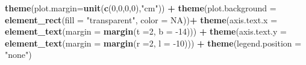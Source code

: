 \documentclass[12pt,oneside]{reedthesis}
\newenvironment{Shaded}{\begin{snugshade}}{\end{snugshade}}
\newcommand{\DataTypeTok}[1]{\textcolor[rgb]{0.13,0.29,0.53}{#1}}
\newcommand{\DecValTok}[1]{\textcolor[rgb]{0.00,0.00,0.81}{#1}}
\newcommand{\KeywordTok}[1]{\textcolor[rgb]{0.13,0.29,0.53}{\textbf{#1}}}
\newcommand{\NormalTok}[1]{#1}
\newcommand{\OperatorTok}[1]{\textcolor[rgb]{0.81,0.36,0.00}{\textbf{#1}}}
\newcommand{\OtherTok}[1]{\textcolor[rgb]{0.56,0.35,0.01}{#1}}
\newcommand{\StringTok}[1]{\textcolor[rgb]{0.31,0.60,0.02}{#1}}
\begin{document}
\begin{Shaded}
\begin{Highlighting}[]
\StringTok{  }\KeywordTok{theme}\NormalTok{(}\DataTypeTok{plot.margin=}\KeywordTok{unit}\NormalTok{(}\KeywordTok{c}\NormalTok{(}\DecValTok{0}\NormalTok{,}\DecValTok{0}\NormalTok{,}\DecValTok{0}\NormalTok{,}\DecValTok{0}\NormalTok{),}\StringTok{"cm"}\NormalTok{)) }\OperatorTok{+}
\StringTok{  }\KeywordTok{theme}\NormalTok{(}\DataTypeTok{plot.background =} \KeywordTok{element_rect}\NormalTok{(}\DataTypeTok{fill =} \StringTok{"transparent"}\NormalTok{, }\DataTypeTok{color =} \OtherTok{NA}\NormalTok{))}\OperatorTok{+}
\StringTok{  }\KeywordTok{theme}\NormalTok{(}\DataTypeTok{axis.text.x =} \KeywordTok{element_text}\NormalTok{(}\DataTypeTok{margin =}  \KeywordTok{margin}\NormalTok{(}\DataTypeTok{t =}\DecValTok{2}\NormalTok{, }\DataTypeTok{b =} \DecValTok{-14}\NormalTok{))) }\OperatorTok{+}\StringTok{ }
\StringTok{  }\KeywordTok{theme}\NormalTok{(}\DataTypeTok{axis.text.y =} \KeywordTok{element_text}\NormalTok{(}\DataTypeTok{margin =}  \KeywordTok{margin}\NormalTok{(}\DataTypeTok{r =}\DecValTok{2}\NormalTok{, }\DataTypeTok{l =} \DecValTok{-10}\NormalTok{))) }\OperatorTok{+}
\StringTok{  }\KeywordTok{theme}\NormalTok{(}\DataTypeTok{legend.position =} \StringTok{"none"}\NormalTok{)}


\end{Highlighting}
\end{Shaded}
\end{document}
